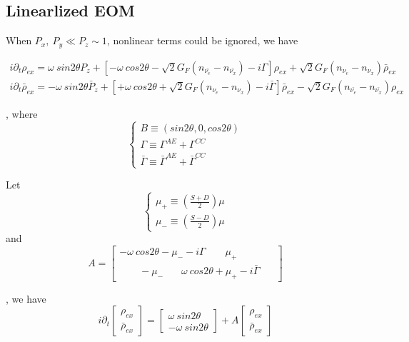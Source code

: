 \documentclass[aps,prd,twocolumn,amsmath,amssymb,groupedaddress]{revtex4-2}
\begin{document}
\subsection{\label{subsec:linear} Linearlized EOM}
When $P_x, ~P_y \ll P_z \sim 1$, nonlinear terms could be ignored, we have
\begin{widetext}
\begin{eqnarray}
	i \partial_t \rho_{ex} = \omega ~sin2\theta P_{z}
	+\left[-\omega ~cos2\theta-\sqrt{2}G_F(n_{\bar{\nu_e}}-n_{\bar{\nu_x}})- i \Gamma \right]\rho_{ex} + \sqrt{2}G_F(n_{\nu_e}-n_{\nu_x}) \bar{\rho}_{ex}\\
	i \partial_t \bar{\rho}_{ex} = - \omega ~sin2\theta \bar{P}_{z} +\left[+\omega ~cos2\theta + \sqrt{2}G_F(n_{\nu_e}-n_{\nu_x}) - i \bar{\Gamma} \right]\bar{\rho}_{ex} -\sqrt{2}G_F(n_{\bar{\nu_e}}-n_{\bar{\nu_x}}) \rho_{ex}
\end{eqnarray}
\end{widetext}
,
where
\begin{equation}
\begin{cases}
	B \equiv (sin 2\theta,0 ,cos 2\theta)
	\\
	\Gamma \equiv \Gamma^{AE} + \Gamma^{CC}
	\\
	\bar{\Gamma} \equiv \bar{\Gamma}^{AE} + \bar{\Gamma}^{CC}
\end{cases}
\end{equation}

Let
\begin{equation}
\begin{cases}
	\mu_+ \equiv \left(\frac{S+D}{2}\right) \mu
	\\
	\mu_- \equiv \left(\frac{S-D}{2}\right) \mu
\end{cases}
\end{equation}
and
\begin{equation}
A = \begin{bmatrix}
	-\omega ~cos2\theta-\mu_--i\Gamma ~~~~~~~~~ \mu_+ ~~~~~~~~~~~~~~~~\\ ~~~~~~~~~ -\mu_- ~~~~~~~~ \omega ~cos2\theta+\mu_+-i\bar{\Gamma}
\end{bmatrix}
\end{equation}

, we have
\begin{equation}
	\label{equ:EOM_matrix}
	i \partial_t \begin{bmatrix}
		\rho_{ex} \\ \bar{\rho}_{ex}
	\end{bmatrix} =
	\begin{bmatrix}
		\omega ~sin2\theta \\ - \omega ~sin2\theta
	\end{bmatrix} + A \begin{bmatrix}
		\rho_{ex} \\ \bar{\rho}_{ex}
	\end{bmatrix}
\end{equation}
\end{document}
